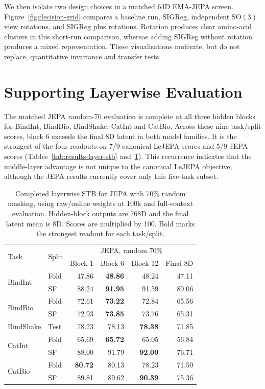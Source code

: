 We then isolate two design choices in a matched 64D EMA-JEPA screen. Figure~\ref{fig:decision-grid} compares a baseline run, SIGReg, independent $\mathrm{SO}(3)$ view rotations, and SIGReg plus rotations. Rotation produces clear amino-acid clusters in this short-run comparison, whereas adding SIGReg without rotation produces a mixed representation. These visualisations motivate, but do not replace, quantitative invariance and transfer tests.

\clearpage
\section{Supporting Layerwise Evaluation}
\label{app:layerwise-supporting}
\label{app:jepa-r70-layerwise}
\begingroup
\setlength{\intextsep}{4pt}
The matched JEPA random-70 evaluation is complete at all three hidden blocks for BindInt, BindBio, BindShake, CatInt and CatBio.
Across these nine task/split scores, block 6 exceeds the final 8D latent in both model families. It is the strongest of the four readouts on 7/9 canonical LeJEPA scores and 5/9 JEPA scores (Tables~\ref{tab:results-layer-stb} and~\ref{tab:results-layer-stb-jepa-r70}).
This recurrence indicates that the middle-layer advantage is not unique to the canonical LeJEPA objective, although the JEPA results currently cover only this five-task subset.

\begin{table}[H]
\centering
\setlength{\tabcolsep}{4pt}
\renewcommand{\arraystretch}{0.86}
\captionsetup{font=small,skip=3pt}
\fontsize{9}{10.5}\selectfont
\caption{Completed layerwise STB for JEPA with 70\% random masking, using raw/online weights at 100k and full-context evaluation. Hidden-block outputs are 768D and the final latent mean is 8D. Scores are multiplied by 100. Bold marks the strongest readout for each task/split.}
\label{tab:results-layer-stb-jepa-r70}
\begin{tabular}{@{}llrrrr@{}}
\toprule
\multirow{2}{*}{Task} & \multirow{2}{*}{Split}
& \multicolumn{4}{c}{JEPA, random 70\%} \\[1.8pt]
& & Block 1 & Block 6 & Block 12 & Final 8D \\
\midrule
\multirow{2}{*}{BindInt}
& Fold & 47.86 & \textbf{48.86} & 48.24 & 47.11 \\
& SF   & 88.24 & \textbf{91.95} & 91.59 & 80.06 \\
\multirow{2}{*}{BindBio}
& Fold & 72.61 & \textbf{73.22} & 72.84 & 65.56 \\
& SF   & 72.93 & \textbf{73.85} & 73.76 & 65.31 \\
BindShake
& Test & 78.23 & 78.13 & \textbf{78.38} & 71.85 \\
\multirow{2}{*}{CatInt}
& Fold & 65.69 & \textbf{65.72} & 65.05 & 56.84 \\
& SF   & 88.00 & 91.79 & \textbf{92.00} & 76.71 \\
\multirow{2}{*}{CatBio}
& Fold & \textbf{80.72} & 80.13 & 78.23 & 71.50 \\
& SF   & 89.81 & 89.62 & \textbf{90.39} & 75.36 \\
\bottomrule
\end{tabular}
\end{table}

